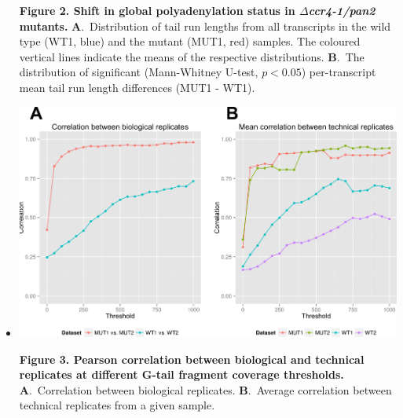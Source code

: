 \documentclass[10pt]{article}
\begin{document}
\begin{itemize}
{\textbf{Figure 2. Shift in global polyadenylation status in \textit{$\Delta$ccr4-1/pan2} mutants.} \textbf{A}.~Distribution of tail run lengths from all transcripts in the wild type (WT1, blue) and the mutant (MUT1, red) samples. The coloured vertical lines indicate the means of the respective distributions.
\textbf{B}.~The distribution of significant (Mann-Whitney U-test, $p < 0.05$) per-transcript mean tail run length differences (MUT1 - WT1).
}
\newpage

\item[]{
\begin{center}
\includegraphics[scale=0.9]{Figure4.png}
\end{center}

\textbf{Figure 3. Pearson correlation between biological and technical replicates at different G-tail fragment coverage thresholds.} \textbf{A}.~Correlation between biological replicates.  \textbf{B}.~Average correlation between technical replicates from a given sample.}
\newpage


\end{itemize}
\end{document}
